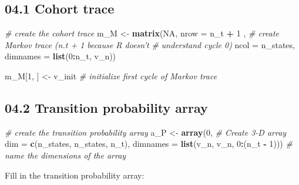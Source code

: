 \documentclass[
]{article}
\newenvironment{Shaded}{\begin{snugshade}}{\end{snugshade}}
\newcommand{\CommentTok}[1]{\textcolor[rgb]{0.56,0.35,0.01}{\textit{#1}}}
\newcommand{\DataTypeTok}[1]{\textcolor[rgb]{0.13,0.29,0.53}{#1}}
\newcommand{\DecValTok}[1]{\textcolor[rgb]{0.00,0.00,0.81}{#1}}
\newcommand{\KeywordTok}[1]{\textcolor[rgb]{0.13,0.29,0.53}{\textbf{#1}}}
\newcommand{\NormalTok}[1]{#1}
\newcommand{\OperatorTok}[1]{\textcolor[rgb]{0.81,0.36,0.00}{\textbf{#1}}}
\newcommand{\OtherTok}[1]{\textcolor[rgb]{0.56,0.35,0.01}{#1}}
\newcommand{\StringTok}[1]{\textcolor[rgb]{0.31,0.60,0.02}{#1}}
\begin{document}
\hypertarget{cohort-trace}{%
\subsection{04.1 Cohort trace}\label{cohort-trace}}

\begin{Shaded}
\begin{Highlighting}[]
\CommentTok{# create the cohort trace}
\NormalTok{m_M <-}\StringTok{ }\KeywordTok{matrix}\NormalTok{(}\OtherTok{NA}\NormalTok{, }
              \DataTypeTok{nrow =}\NormalTok{ n_t }\OperatorTok{+}\StringTok{ }\DecValTok{1}\NormalTok{ ,  }\CommentTok{# create Markov trace (n.t + 1 because R doesn't }
                                \CommentTok{# understand cycle 0)}
              \DataTypeTok{ncol =}\NormalTok{ n_states, }
              \DataTypeTok{dimnames =} \KeywordTok{list}\NormalTok{(}\DecValTok{0}\OperatorTok{:}\NormalTok{n_t, v_n))}

\NormalTok{m_M[}\DecValTok{1}\NormalTok{, ] <-}\StringTok{ }\NormalTok{v_init  }\CommentTok{# initialize first cycle of Markov trace}
\end{Highlighting}
\end{Shaded}

\hypertarget{transition-probability-array}{%
\subsection{04.2 Transition probability
array}\label{transition-probability-array}}

\begin{Shaded}
\begin{Highlighting}[]
\CommentTok{# create the transition probability array}
\NormalTok{a_P <-}\StringTok{ }\KeywordTok{array}\NormalTok{(}\DecValTok{0}\NormalTok{,                                      }\CommentTok{# Create 3-D array}
             \DataTypeTok{dim =} \KeywordTok{c}\NormalTok{(n_states, n_states, n_t),}
             \DataTypeTok{dimnames =} \KeywordTok{list}\NormalTok{(v_n, v_n, }\DecValTok{0}\OperatorTok{:}\NormalTok{(n_t }\OperatorTok{-}\StringTok{ }\DecValTok{1}\NormalTok{))) }\CommentTok{# name the dimensions of the array }
\end{Highlighting}
\end{Shaded}

Fill in the transition probability array:
\end{document}
